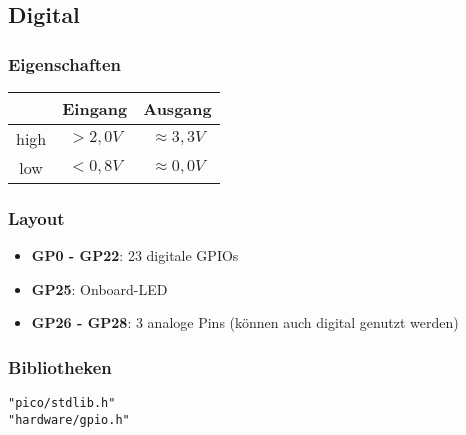 \documentclass[a4paper,12pt,twoside]{article}
\begin{document}
\subsection{Digital}
\subsubsection{Eigenschaften}
\begin{center}
	\begin{tabular}{|c|c|c|}
		\hline
		     & \textbf{Eingang} & \textbf{Ausgang} \\
		\hline
		\hline
		high & $> 2,0V$         & $\approx 3,3V$   \\
		\hline
		low  & $< 0,8V$         & $\approx 0,0V$   \\
		\hline
	\end{tabular}
\end{center}
\subsubsection{Layout}
\begin{itemize}
	\item \textbf{GP0 - GP22}: 23 digitale GPIOs
	\item \textbf{GP25}: Onboard-LED
	\item \textbf{GP26 - GP28}: 3 analoge Pins (können auch digital genutzt werden)
\end{itemize}
\subsubsection{Bibliotheken}
\verb|"pico/stdlib.h"| \\
\verb|"hardware/gpio.h"| \\
\end{document}
